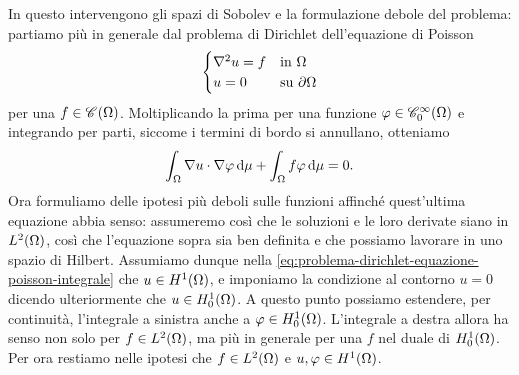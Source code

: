 In questo intervengono gli spazi di Sobolev e la formulazione debole del problema: partiamo più in generale dal problema di Dirichlet dell'equazione di Poisson
\begin{equation}
    \begin{cases}
        \lap u=f & \text{in }\Omega\\
        u=0      & \text{su }\boundary\Omega
    \end{cases}
    \label{eq:problema-dirichlet-equazione-poisson}
\end{equation}
per una $f\in\cont{\Omega}$.
Moltiplicando la prima per una funzione $\phi\in\contsc[\infty]{\Omega}$ e integrando per parti, siccome i termini di bordo si annullano, otteniamo
\begin{equation}
    \int_\Omega\scalar{\grad u}{\grad\phi}\,\dd\mu+\int_\Omega f\phi\,\dd\mu=0.
    \label{eq:problema-dirichlet-equazione-poisson-integrale}
\end{equation}
Ora formuliamo delle ipotesi più deboli sulle funzioni affinch\'e quest'ultima equazione abbia senso: assumeremo cos\`i che le soluzioni e le loro derivate siano in $\leb[2]{\Omega}$, cos\`i che l'equazione sopra sia ben definita e che possiamo lavorare in uno spazio di Hilbert.
Assumiamo dunque nella \eqref{eq:problema-dirichlet-equazione-poisson-integrale} che $u\in\sobH[1]{\Omega}$, e imponiamo la condizione al contorno $u=0$ dicendo ulteriormente che $u\in\sobHc[1]{\Omega}$.
A questo punto possiamo estendere, per continuità, l'integrale a sinistra anche a $\phi\in\sobHc[1]{\Omega}$.
L'integrale a destra allora ha senso non solo per $f\in\leb[2]{\Omega}$, ma più in generale per una $f$ nel duale di $\sobHc[1]{\Omega}$.
Per ora restiamo nelle ipotesi che $f\in\leb[2]{\Omega}$ e $u,\phi\in\sobH[1]{\Omega}$.

